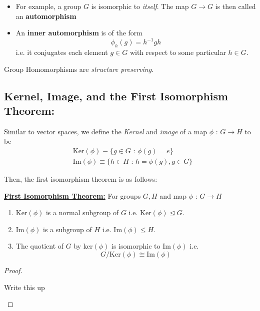 \documentclass[11pt]{article}
\begin{document}
\vskip 0.5cm
\begin{dottedbox}
\begin{itemize}
  \item   For example, a group $G$ is isomorphic to \emph{itself}. The map $G \rightarrow G$ is then called an \textbf{ automorphism} 
  
  \item An \textbf{inner automorphism} is of the form 
  \[ \phi_h(g) = h^{-1}gh \]
  i.e. it conjugates each element $g \in G$ with respect to some particular $h \in G$.
\end{itemize}
\end{dottedbox}

\vskip 0.5cm
Group Homomorphisms are \emph{structure preserving}.


\vskip 1cm
\subsection{Kernel, Image, and the First Isomorphism Theorem:}

Similar to vector spaces, we define the \emph{Kernel} and \emph{image} of a map $\phi \text{ : } G \rightarrow H$ to be 
\begin{align*}
  &\text{Ker}(\phi) \equiv \{ g \in G \text{ : } \phi(g) = e \} \\
  &\text{Im}(\phi) \equiv \{ h \in H \text{ : } h = \phi(g), g \in G \} 
\end{align*}

Then, the first isomorphism theorem is as follows:

\vskip 0.5cm
\begin{dottedbox}
  \begin{theorem}
      \underline{\textbf{First Isomorphism Theorem:}} For groups $G, H$ and map $\phi \text{ : } G \rightarrow H$
      \begin{enumerate}[label=(\alph*)]
        \item Ker$(\phi)$ is a normal subgroup of $G$ i.e. Ker$(\phi) \trianglelefteq G$.
        \item Im$(\phi)$ is a subgroup of $H$ i.e. Im$(\phi) \leq H$.
        \item The quotient of $G$ by ker$(\phi)$ is isomorphic to Im$(\phi)$ i.e.
        \[ G / \text{Ker}(\phi) \cong \text{Im}(\phi) \]
      \end{enumerate}
  \end{theorem}
\end{dottedbox}

\begin{dottedbox}
  \begin{proof}
    \begin{note}
      {Write this up}
    \end{note}
  \end{proof}
\end{dottedbox}
\end{document}
